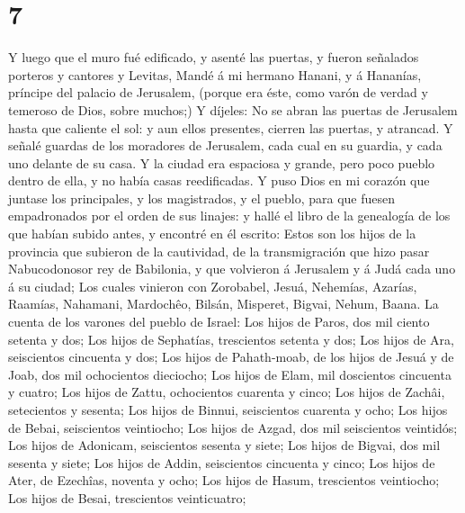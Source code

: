 \hypertarget{section-6}{%
\section{7}\label{section-6}}

 Y luego que el muro fué edificado, y asenté las puertas,
y fueron señalados porteros y cantores y Levitas,  Mandé á
mi hermano Hanani, y á Hananías, príncipe del palacio de Jerusalem,
(porque era éste, como varón de verdad y temeroso de Dios, sobre
muchos;)  Y díjeles: No se abran las puertas de Jerusalem
hasta que caliente el sol: y aun ellos presentes, cierren las puertas, y
atrancad. Y señalé guardas de los moradores de Jerusalem, cada cual en
su guardia, y cada uno delante de su casa.  Y la ciudad
era espaciosa y grande, pero poco pueblo dentro de ella, y no había
casas reedificadas.  Y puso Dios en mi corazón que juntase
los principales, y los magistrados, y el pueblo, para que fuesen
empadronados por el orden de sus linajes: y hallé el libro de la
genealogía de los que habían subido antes, y encontré en él escrito:
 Estos son los hijos de la provincia que subieron de la
cautividad, de la transmigración que hizo pasar Nabucodonosor rey de
Babilonia, y que volvieron á Jerusalem y á Judá cada uno á su ciudad;
 Los cuales vinieron con Zorobabel, Jesuá, Nehemías,
Azarías, Raamías, Nahamani, Mardochêo, Bilsán, Misperet, Bigvai, Nehum,
Baana. La cuenta de los varones del pueblo de Israel:  Los
hijos de Paros, dos mil ciento setenta y dos;  Los hijos
de Sephatías, trescientos setenta y dos;  Los hijos de
Ara, seiscientos cincuenta y dos;  Los hijos de
Pahath-moab, de los hijos de Jesuá y de Joab, dos mil ochocientos
dieciocho;  Los hijos de Elam, mil doscientos cincuenta y
cuatro;  Los hijos de Zattu, ochocientos cuarenta y
cinco;  Los hijos de Zachâi, setecientos y sesenta;
 Los hijos de Binnui, seiscientos cuarenta y ocho;
 Los hijos de Bebai, seiscientos veintiocho;
 Los hijos de Azgad, dos mil seiscientos veintidós;
 Los hijos de Adonicam, seiscientos sesenta y siete;
 Los hijos de Bigvai, dos mil sesenta y siete;
 Los hijos de Addin, seiscientos cincuenta y cinco;
 Los hijos de Ater, de Ezechîas, noventa y ocho;
 Los hijos de Hasum, trescientos veintiocho;
 Los hijos de Besai, trescientos veinticuatro;
